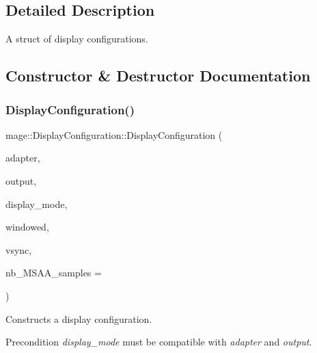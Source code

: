 \subsection{Detailed Description}
A struct of display configurations. 

\subsection{Constructor \& Destructor Documentation}
\hypertarget{structmage_1_1_display_configuration_a8c2bb805e60d4a18eeb7745c35f8b6da}{}\label{structmage_1_1_display_configuration_a8c2bb805e60d4a18eeb7745c35f8b6da} 
\subsubsection{\texorpdfstring{Display\+Configuration()}{DisplayConfiguration()}\hspace{0.1cm}{\footnotesize\ttfamily [1/3]}}
{\footnotesize\ttfamily mage\+::\+Display\+Configuration\+::\+Display\+Configuration (\begin{DoxyParamCaption}\item[{\hyperlink{namespacemage_ae74f374780900893caa5555d1031fd79}{Com\+Ptr}$<$ I\+D\+X\+G\+I\+Adapter2 $>$}]{adapter,  }\item[{\hyperlink{namespacemage_ae74f374780900893caa5555d1031fd79}{Com\+Ptr}$<$ I\+D\+X\+G\+I\+Output2 $>$}]{output,  }\item[{const D\+X\+G\+I\+\_\+\+M\+O\+D\+E\+\_\+\+D\+E\+S\+C1 \&}]{display\+\_\+mode,  }\item[{bool}]{windowed,  }\item[{bool}]{vsync,  }\item[{U\+I\+NT}]{nb\+\_\+\+M\+S\+A\+A\+\_\+samples = {} }\end{DoxyParamCaption})\hspace{0.3cm}{\ttfamily [explicit]}}

Constructs a display configuration.

\begin{DoxyPrecond}{Precondition}
{\itshape display\+\_\+mode} must be compatible with {\itshape adapter} and {\itshape output}. 
\end{DoxyPrecond}


